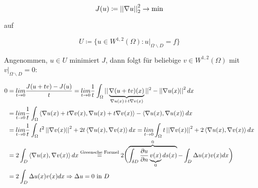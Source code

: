     \[ J(u) \coloneqq  \left|\left| \nabla u \right|\right|_2^2 \to \text{min} \]

    auf

    \[U \coloneqq \{u \in W^{1,2}(\Omega) : u|_{\Omega \backslash D} = f\} \]

    Angenommen, $u \in U$ minimiert $J$, dann folgt für beliebige $v \in W^{1,2} (\Omega)$ mit $v|_{\Omega \backslash D}=0$:

    \begin{align*}
      0 &= \underset{t \to 0}{lim} \frac{J(u+tv) - J(u)}{t} = \underset{t \to 0}{lim} \frac{1}{t} \int_\Omega ||\underbrace{\nabla(u+tv)(x)}_{\nabla u(x) + t \nabla v(x)}||^2 - \left|\left| \nabla u(x) \right|\right|^2 dx\\
      &=\underset{t \to 0}{lim} \frac{1}{t} \int_\Omega \left \langle \nabla u(x) + t \nabla v(x),\nabla u(x) + t \nabla v(x) \right \rangle - \left \langle \nabla u (x),\nabla u (x) \right \rangle dx\\
      &=\underset{t \to 0}{lim} \frac{1}{t} \int_\Omega t^2 \left|\left| \nabla v(x) \right|\right|^2 + 2 t \left \langle \nabla u(x),\nabla v(x) \right \rangle dx =  \underset{t \to 0}{lim} \int_\Omega t \left|\left| \nabla v(x) \right|\right|^2 + 2 \left \langle \nabla u(x),\nabla v(x) \right \rangle dx\\
      &=2 \int_D \left \langle \nabla u(x),\nabla v(x) \right \rangle dx \overset{\text{Greensche Formel}}{=} 2 \biggl( \overbrace{\int_{\delta D} \frac{\partial u}{\partial n} \underbrace{v(x)}_{0} ds(x)}^{0} - \int_D \Delta u(x) v(x) dx \biggr)\\
      &=2 \int_D \Delta u(x) v(x) dx \Rightarrow \Delta u =0 \text{ in } D
    \end{align*}

